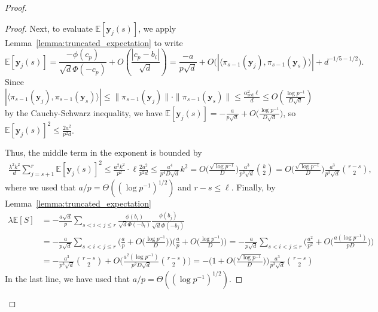 \documentclass[11pt]{amsart}
\theoremstyle{definition}
\def\bE{\mathbb{E}}
\def\by{\boldsymbol{y}}
\DeclareMathOperator{\red}{red}
\begin{document}
\begin{proof}
\begin{proof}
Next, to evaluate $\bE [\by_j(s)]$, we apply Lemma~\ref{lemma:truncated_expectation} to write
{\smaller[0.3]
\[\bE [\by_j(s)]=\frac{-\phi(c_p)}{\sqrt{d}\Phi(-c_p)}+O(\frac{|c_p-b_i|}{\sqrt{d}})=\frac{-a}{p\sqrt{d}}+O\Big(|\langle \pi_{s-1}(\by_j), \pi_{s-1}(\by_s)\rangle|+d^{-1/5-1/2}\Big).\]
}
Since $|\langle \pi_{s-1}(\by_j), \pi_{s-1}(\by_s)\rangle|\leq \|\pi_{s-1}(\by_j)\|\cdot \|\pi_{s-1}(\by_s)\|\leq \frac{\alpha_{\red}^2\ell}{d}\leq O(\frac{\log p^{-1}}{D\sqrt{d}})$ by the Cauchy-Schwarz inequality, we have $\bE [\by_j(s)]=-\frac{a}{p\sqrt{d}}+O\big(\frac{\log p^{-1}}{D\sqrt{d}}\big)$, so $\bE [\by_j(s)]^2\leq \frac{2a^2}{p^2d}$. 

Thus, the middle term in the exponent is bounded by
{\smaller[0.3]
\begin{align*}
\frac{\lambda^2k^2}{d}\!\!\!\sum_{j=s+1}^r \bE [\by_j(s)]^2\!\leq \frac{a^2k^2}{p^2}\cdot \ell\frac{2a^2}{p^2d}\leq \frac{a^4}{p^4D\sqrt{d}}k^2\!=\!O\Big( \frac{\sqrt{\log p^{-1}}}{D}\Big)\frac{a^3}{p^3\sqrt{d}}\binom{k}{2}\!=\!O\Big( \frac{\sqrt{\log p^{-1}}}{D}\Big)\frac{a^3}{p^3\sqrt{d}}\binom{r\!-\!s}{2},
\end{align*}
}
where we used that $a/p=\Theta((\log p^{-1})^{1/2})$ and $r-s\leq \ell$. Finally, by Lemma~\ref{lemma:truncated_expectation}
{\smaller[0.3]
\begin{align*}
\lambda \bE[S]&=-\frac{a\sqrt{d}}{p}\sum_{s<i<j\leq r}\frac{\phi(b_i)}{\sqrt{d}\Phi(-b_i)}\frac{\phi(b_j)}{\sqrt{d}\Phi(-b_j)}\\
&=-\frac{a}{p\sqrt{d}}\sum_{s<i<j\leq r}\Big(\frac{a}{p}+O\big(\frac{\log p^{-1}}{D}\big)\Big)\Big(\frac{a}{p}+O\big(\frac{\log p^{-1}}{D}\big)\Big)=-\frac{a}{p\sqrt{d}}\sum_{s<i<j\leq r}\bigg(\frac{a^2}{p^2}+O\Big(\frac{a(\log p^{-1})}{pD}\Big)\bigg)\\
    &=-\frac{a^3}{p^3\sqrt{d}}\binom{r-s}{2}+O\Big(\frac{a^2(\log p^{-1})}{p^2D\sqrt{d}}\binom{r-s}{2}\Big)=-\Big(1+O\big( \frac{\sqrt{\log p^{-1}}}{D}\big)\Big)\frac{a^3}{p^3\sqrt{d}}\binom{r-s}{2}
\end{align*}
}
In the last line, we have used that $a/p=\Theta((\log p^{-1})^{1/2})$.
\end{proof}


\end{proof}
\end{document}
